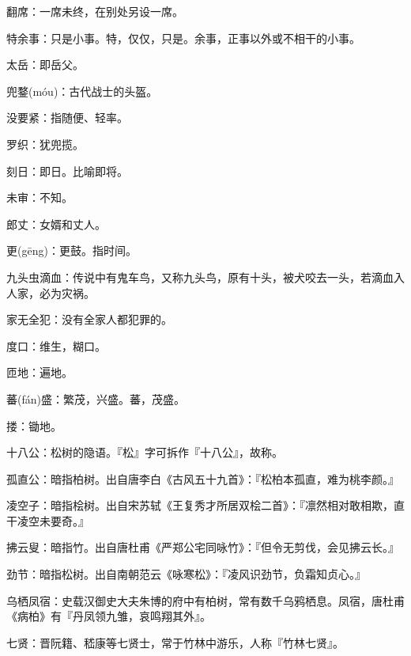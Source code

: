 \startbuffer[1818]
翻席：一席未终，在别处另设一席。
\stopbuffer


\startbuffer[1819]
特余事：只是小事。特，仅仅，只是。余事，正事以外或不相干的小事。
\stopbuffer


\startbuffer[1820]
太岳：即岳父。
\stopbuffer


\startbuffer[1821]
兜鍪(móu)：古代战士的头盔。
\stopbuffer


\startbuffer[1822]
没要紧：指随便、轻率。
\stopbuffer


\startbuffer[1823]
罗织：犹兜揽。
\stopbuffer


\startbuffer[1824]
刻日：即日。比喻即将。
\stopbuffer


\startbuffer[1825]
未审：不知。
\stopbuffer


\startbuffer[1826]
郎丈：女婿和丈人。
\stopbuffer


\startbuffer[1827]
更(gēng)：更鼓。指时间。
\stopbuffer


\startbuffer[1828]
九头虫滴血：传说中有鬼车鸟，又称九头鸟，原有十头，被犬咬去一头，若滴血入人家，必为灾祸。
\stopbuffer


\startbuffer[1829]
家无全犯：没有全家人都犯罪的。
\stopbuffer


\startbuffer[1830]
度口：维生，糊口。
\stopbuffer


\startbuffer[1831]
匝地：遍地。
\stopbuffer


\startbuffer[1832]
蕃(fán)盛：繁茂，兴盛。蕃，茂盛。
\stopbuffer


\startbuffer[1833]
搂：锄地。
\stopbuffer


\startbuffer[1834]
十八公：松树的隐语。『松』字可拆作『十八公』，故称。
\stopbuffer


\startbuffer[1835]
孤直公：暗指柏树。出自唐李白《古风五十九首》：『松柏本孤直，难为桃李颜。』
\stopbuffer


\startbuffer[1836]
凌空子：暗指桧树。出自宋苏轼《王复秀才所居双桧二首》：『凛然相对敢相欺，直干凌空未要奇。』
\stopbuffer


\startbuffer[1837]
拂云叟：暗指竹。出自唐杜甫《严郑公宅同咏竹》：『但令无剪伐，会见拂云长。』
\stopbuffer


\startbuffer[1838]
劲节：暗指松树。出自南朝范云《咏寒松》：『凌风识劲节，负霜知贞心。』
\stopbuffer


\startbuffer[1839]
乌栖凤宿：史载汉御史大夫朱博的府中有柏树，常有数千乌鸦栖息。凤宿，唐杜甫《病柏》有『丹凤领九雏，哀鸣翔其外』。
\stopbuffer


\startbuffer[1840]
七贤：晋阮籍、嵇康等七贤士，常于竹林中游乐，人称『竹林七贤』。
\stopbuffer


